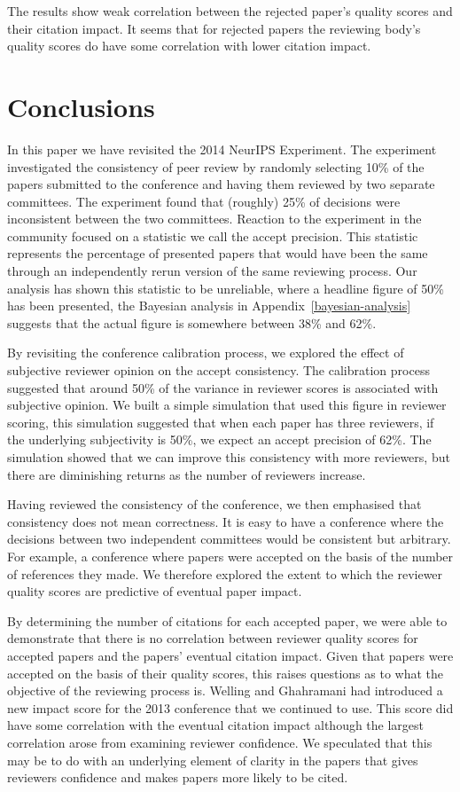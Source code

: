 \documentclass[twoside]{article}
\begin{document}
The results show weak correlation between the rejected paper's quality
scores and their citation impact. It seems that for rejected papers the reviewing body's quality scores do have some correlation with  lower citation impact. 

\section{Conclusions}

In this paper we have revisited the 2014 NeurIPS Experiment. The
experiment investigated the consistency of peer review by randomly
selecting 10\% of the papers submitted to the conference and having
them reviewed by two separate committees. The experiment found that
(roughly) 25\% of decisions were inconsistent between the two
committees. Reaction to the experiment in the community focused on a
statistic we call the accept precision. This statistic represents the
percentage of presented papers that would have been the same through
an independently rerun version of the same reviewing process. Our analysis has shown this statistic to be
unreliable, where a headline figure of 50\% has been presented, the  Bayesian analysis in Appendix~\ref{bayesian-analysis} suggests that the actual figure is somewhere between 38\% and 62\%.

By revisiting the conference calibration process, we explored the
effect of subjective reviewer opinion on the accept consistency. The
calibration process suggested that around 50\% of the variance in
reviewer scores is associated with subjective opinion. We built a
simple simulation that used this figure in reviewer scoring, this
simulation suggested that when each paper has three reviewers, if the
underlying subjectivity is 50\%, we expect an accept precision of
62\%. The simulation showed that we can improve this consistency with
more reviewers, but there are diminishing returns as the number of
reviewers increase.

Having reviewed the consistency of the conference, we then emphasised
that consistency does not mean correctness. It is easy to have a
conference where the decisions between two independent committees
would be consistent but arbitrary. For example, a conference where papers
were accepted on the basis of the number of references they made. We
therefore explored the extent to which the reviewer quality scores are
predictive of eventual paper impact.

By determining the number of citations for each accepted paper, we
were able to demonstrate that there is no correlation between reviewer
quality scores for accepted papers and the papers' eventual citation
impact. Given that papers were accepted on the basis of their quality
scores, this raises questions as to what the objective of the
reviewing process is. Welling and Ghahramani had introduced a new
impact score for the 2013 conference that we
continued to use. This score did have some correlation with the
eventual citation impact although the largest correlation arose from
examining reviewer confidence. We speculated that this may be to do
with an underlying element of clarity in the papers that gives
reviewers confidence and makes papers more likely to be cited.
\end{document}
